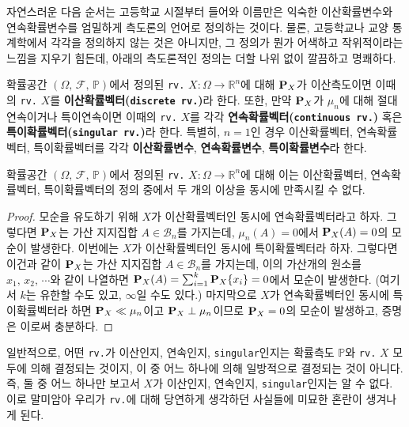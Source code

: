 자연스러운 다음 순서는 고등학교 시절부터 들어와 이름만은 익숙한 이산확률변수와 연속확률변수를 엄밀하게 측도론의 언어로 정의하는 것이다. 물론, 고등학교나 교양 통계학에서 각각을 정의하지 않는 것은 아니지만, 그 정의가 뭔가 어색하고 작위적이라는 느낌을 지우기 힘든데, 아래의 측도론적인 정의는 더할 나위 없이 깔끔하고 명쾌하다.

\begin{definition}
    확률공간 $(\Omega,\,\mathcal{F},\,\mathbb{P})$에서 정의된 \texttt{rv.} $X:\Omega\to\mathbb{R}^n$에 대해 $\mathbf{P}_X$가 이산측도이면 이때의 \texttt{rv.} $X$를 \textbf{이산확률벡터(\texttt{discrete rv.})}라 한다. 또한, 만약 $\mathbf{P}_X$가 $\mu_n$에 대해 절대연속이거나 특이연속이면 이때의 \texttt{rv.} $X$를 각각 \textbf{연속확률벡터(\texttt{continuous rv.})} 혹은 \textbf{특이확률벡터(\texttt{singular rv.})}라 한다. 특별히, $n=1$인 경우 이산확률벡터, 연속확률벡터, 특이확률벡터를 각각 \textbf{이산확률변수}, \textbf{연속확률변수}, \textbf{특이확률변수}라 한다.
\end{definition}

\begin{proposition}
    확률공간 $(\Omega,\,\mathcal{F},\,\mathbb{P})$에서 정의된 \texttt{rv.} $X:\Omega\to\mathbb{R}^n$에 대해 이는 이산확률벡터, 연속확률벡터, 특이확률벡터의 정의 중에서 두 개의 이상을 동시에 만족시킬 수 없다.
\end{proposition}

\begin{proof}
    모순을 유도하기 위해 $X$가 이산확률벡터인 동시에 연속확률벡터라고 하자. 그렇다면 $\mathbf{P}_X$는 가산 지지집합 $A\in\mathcal{B}_n$를 가지는데, $\mu_n(A)=0$에서 $\mathbf{P}_X(A)=0$의 모순이 발생한다. 이번에는 $X$가 이산확률벡터인 동시에 특이확률벡터라 하자. 그렇다면 이건과 같이 $\mathbf{P}_X$는 가산 지지집합 $A\in\mathcal{B}_n$를 가지는데, 이의 가산개의 원소를 $x_1,\,x_2,\,\cdots$와 같이 나열하면 $\mathbf{P}_X(A)=\sum_{i=1}^k\mathbf{P}_X\{x_i\}=0$에서 모순이 발생한다. (여기서 $k$는 유한할 수도 있고, $\infty$일 수도 있다.) 마지막으로 $X$가 연속확률벡터인 동시에 특이확률벡터라 하면 $\mathbf{P}_X\ll\mu_n$이고 $\mathbf{P}_X\perp\mu_n$이므로 $\mathbf{P}_X=0$의 모순이 발생하고, 증명은 이로써 충분하다.
\end{proof}

일반적으로, 어떤 \texttt{rv.}가 이산인지, 연속인지, \texttt{singular}인지는 확률측도 $\mathbb{P}$와 \texttt{rv.} $X$ 모두에 의해 결정되는 것이지, 이 중 어느 하나에 의해 일방적으로 결정되는 것이 아니다. 즉, 둘 중 어느 하나만 보고서 $X$가 이산인지, 연속인지, \texttt{singular}인지는 알 수 없다. 이로 말미암아 우리가 \texttt{rv.}에 대해 당연하게 생각하던 사실들에 미묘한 혼란이 생겨나게 된다.

